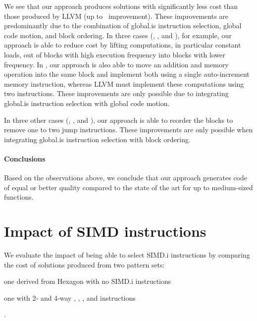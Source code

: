 We see that our approach produces \glspl{solution} with significantly less
cost than those produced by \gls{LLVM} (up to~\printSpeedup{%
  \UnisonVsLlvmHexagonFiveCyclesSpeedupCyclesZeroCenteredSpeedupMax%
} improvement).
%
These improvements are predominantly due to the combination of \gls{global.is}
\gls{instruction selection}, \gls{global code motion}, and \gls{block ordering}.
%
In three cases (, , and
), for example, our approach is able to reduce cost by lifting
computations, in particular constant loads, out of \glspl{block} with high
execution frequency into \glspl{block} with lower frequency.
%
In , our approach is also able to move an addition and
memory \gls{operation} into the same \gls{block} and implement both using a
single auto-increment memory \gls{instruction}, whereas \gls{LLVM} must
implement these computations using two \glspl{instruction}.
%
These improvements are only possible due to integrating \gls{global.is}
\gls{instruction selection} with \gls{global code motion}.

In three other cases (, ,
and ), our approach is able to reorder the
\glspl{block} to remove one to two jump \glspl{instruction}.
%
These improvements are only possible when integrating \gls{global.is}
\gls{instruction selection} with \gls{block ordering}.


\paragraph{Conclusions}

Based on the observations above, we conclude that our approach generates code of
equal or better quality compared to the state of the art for up to medium-sized
\glspl{function}.


\section{Impact of SIMD instructions}

We evaluate the impact of being able to select \gls{SIMD.i} \glspl{instruction}
by comparing the cost of \glspl{solution} produced from two \glspl{pattern set}:
%
\begin{patternList}
  \item {}
    one derived from \gls{Hexagon} with no \gls{SIMD.i} \glspl{instruction}
  \item {}
    one with \num{2}- and \num{4}-way , , ,
    and  \glspl{instruction}
\end{patternList}.


